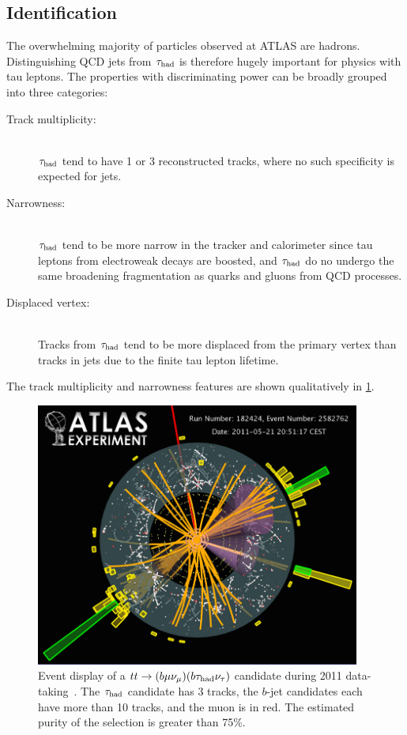 \subsection{Identification}

The overwhelming majority of particles observed at ATLAS are hadrons. Distinguishing QCD jets from $\tau_\text{had}$ is therefore hugely important for physics with tau leptons. The properties with discriminating power can be broadly grouped into three categories:
%
\begin{description}
    \item[Track multiplicity:] \hfill \\
      $\tau_\text{had}$ tend to have 1 or 3 reconstructed tracks, where no such specificity is expected for jets.
    \item[Narrowness:]         \hfill \\
      $\tau_\text{had}$ tend to be more narrow in the tracker and calorimeter since tau leptons from electroweak decays are boosted, and $\tau_\text{had}$ do no undergo the same broadening fragmentation as quarks and gluons from QCD processes.
    \item[Displaced vertex:]   \hfill \\
      Tracks from $\tau_\text{had}$ tend to be more displaced from the primary vertex than tracks in jets due to the finite tau lepton lifetime.
\end{description}
%
The track multiplicity and narrowness features are shown qualitatively in \cref{fig:taus-eventdisplay}.

\begin{figure}[tp]
  \centering
  \includegraphics[width=0.95\textwidth]{figures/tauperformance/vp1_3dcocktail_run182424_evt2582762_tttaumu}
  \caption{Event display of a $tt \rightarrow (b\mu\nu_\mu)(b\tau_\text{had}\nu_\tau)$ candidate during 2011 data-taking~\cite{atlas-eventdisplays}. The $\tau_\text{had}$ candidate has 3 tracks, the $b$-jet candidates each have more than 10 tracks, and the muon is in red. The estimated purity of the selection is greater than 75\%.}
  \label{fig:taus-eventdisplay}
\end{figure}

